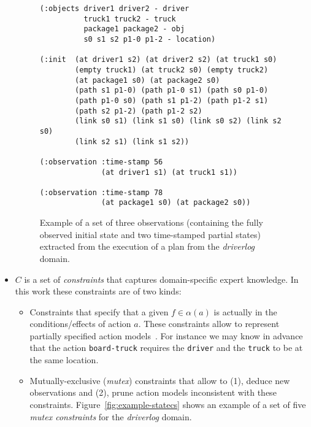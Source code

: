 \documentclass{ecai}
\begin{document}
\begin{itemize}
\begin{figure}[hbt!]
\begin{scriptsize}    
\begin{verbatim}
(:objects driver1 driver2 - driver
          truck1 truck2 - truck
          package1 package2 - obj
          s0 s1 s2 p1-0 p1-2 - location)

(:init	(at driver1 s2)	(at driver2 s2) (at truck1 s0)
        (empty truck1) (at truck2 s0) (empty truck2) 
        (at package1 s0) (at package2 s0)
        (path s1 p1-0) (path p1-0 s1) (path s0 p1-0) 
        (path p1-0 s0) (path s1 p1-2) (path p1-2 s1)
        (path s2 p1-2) (path p1-2 s2)
        (link s0 s1) (link s1 s0) (link s0 s2) (link s2 s0)
        (link s2 s1) (link s1 s2))

(:observation :time-stamp 56
              (at driver1 s1) (at truck1 s1))

(:observation :time-stamp 78
              (at package1 s0) (at package2 s0))
\end{verbatim}
\end{scriptsize}    
\caption{Example of a set of three observations (containing the fully observed initial state and two time-stamped partial states) extracted from the execution of a plan from the {\em driverlog} domain.}
\label{fig:exampleObservations}
\end{figure}  


\item $C$ is a set of {\em constraints} that captures domain-specific expert knowledge. In this work these constraints are of two kinds: 
\begin{itemize}
\item Constraints that specify that a given $f\in \alpha(a)$ is actually in the conditions/effects of action $a$. These constraints allow to represent partially specified action models~\cite{zhuo2013refining}. For instance we may know in advance that  the action {\tt board-truck} requires the {\tt driver} and the {\tt truck} to be at the same location. 
\item Mutually-exclusive ({\em mutex}) constraints that allow to (1), deduce new observations and (2), prune action models inconsistent with these constraints. Figure~\ref{fig:example-statecs} shows an example of a set of five {\em mutex constraints} for the {\em driverlog} domain. 
\end{itemize}
\end{itemize}
\end{document}
